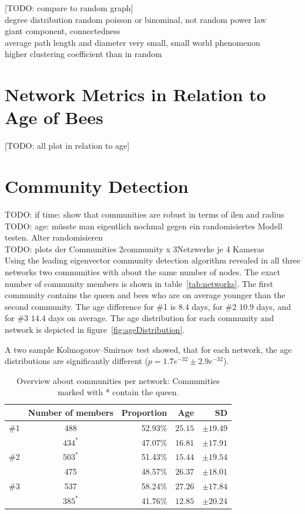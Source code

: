 [TODO: compare to random graph]\\
degree distribution random poisson or binominal, not random power law\\
giant component, connectedness\\
average path length and diameter very small, small world phenomenon\\
higher clustering coefficient than in random\\

\section{Network Metrics in Relation to Age of Bees}

[TODO: all plot in relation to age]

\section{Community Detection}

TODO: if time: show that communities are robust in terms of ilen and radius\\
TODO: age: müsste man eigentlich nochmal gegen ein randomisiertes Modell testen. Alter randomisieren\\
TODO: plots der Communities 2community x 3Netzwerke je 4 Kameras\\

Using the leading eigenvector community detection algorithm revealed in all three networks two communities with about the same number of nodes. The exact number of community members is shown in table~\ref{tab:networks}. The first community contains the queen and bees who are on average younger than the second community. The age difference for \#1 is $8.4$ days, for \#2 $10.9$ days, and for \#3 $14.4$ days on average. The age distribution for each community and network is depicted in figure~\ref{fig:ageDistribution}.

A two sample Kolmogorov–Smirnov test showed, that for each network, the age distributions are significantly different ($p=1.7e^{-32} \pm2.9e^{-32}$).

\begin{table}
\centering
\begin{tabular}{ccrrr}
	\toprule
	{}  & Number of members & Proportion & Age & SD\\
	\midrule 
	\#1  & 488     & 52.93\% & $25.15$ & $\pm19.49$ \\
	             & $434^*$ & 47.07\% & $16.81$ & $\pm17.91$ \\
	\midrule   							
	\#2  & $503^*$ & 51.43\% & $15.44$ & $\pm19.54$ \\
	             & 475     & 48.57\% & $26.37$ & $\pm18.01$ \\
	\midrule  
	\#3  & 537     & 58.24\% & $27.26$ & $\pm17.84$ \\
	             & $385^*$ & 41.76\% & $12.85$ & $\pm20.24$ \\
	\bottomrule
\end{tabular}
\caption[Overview about communities]{Overview about communities per network: Communities marked with * contain the queen.}
\label{tab:communities}
\end{table}

